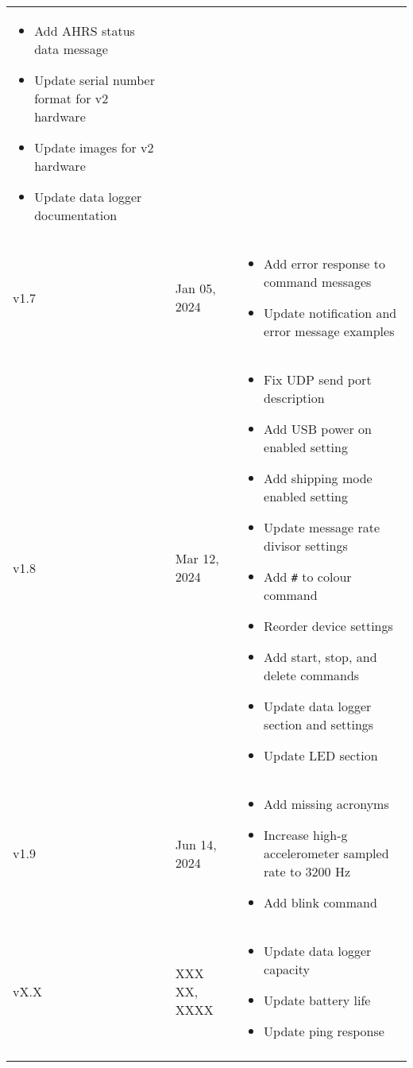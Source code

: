 \begin{longtable}{| >{\centering}p{} | p{} | >{\raggedright\arraybackslash}p{} |}
\begin{itemize}
        \item Add \acs{AHRS} status data message
        \item Update serial number format for v2 hardware
        \item Update images for v2 hardware
        \item Update data logger documentation
    \end{itemize}\\
    v1.7 & Jan 05, 2024 &
    \begin{itemize}
        \item Add error response to command messages
        \item Update notification and error message examples
    \end{itemize}\\
    v1.8 & Mar 12, 2024 &
    \begin{itemize}
        \item Fix \acs{UDP} send port description
        \item Add \ac{USB} power on enabled setting
        \item Add shipping mode enabled setting
        \item Update message rate divisor settings
        \item Add \texttt{\#} to colour command
        \item Reorder device settings
        \item Add start, stop, and delete commands
        \item Update data logger section and settings
        \item Update \ac{LED} section
    \end{itemize}\\
    v1.9 & Jun 14, 2024 &
    \begin{itemize}
        \item Add missing acronyms
        \item Increase high-g accelerometer sampled rate to 3200 Hz
        \item Add blink command
    \end{itemize}\\
    vX.X & XXX XX, XXXX &
    \begin{itemize}
        \item Update data logger capacity
        \item Update battery life
        \item Update ping response
    \end{itemize}\\    
    \arrayrulecolor{gray!50}\hline
\end{longtable}
